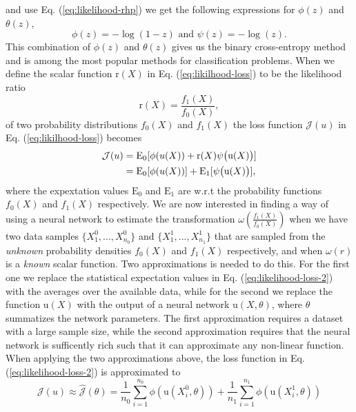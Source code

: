 \documentclass[../../main/main.tex]{subfiles}
\begin{document}
and use Eq. (\ref{eq:likelihood-rhp}) we get the following expressions for \(\phi(z)\) and \(\theta(z)\),
\begin{equation}
  \label{eq:1}
  \phi(z) = - \log{(1 - z)} \text{ and } \psi(z) = - \log{(z)}.
\end{equation}
This combination of \(\phi(z)\) and \(\theta(z)\) gives us the binary cross-entropy method and is among the most popular methods for classification problems.
When we define the scalar function \(\mathrm{r}(X)\) in Eq. (\ref{eq:likilhood-loss}) to be the likelihood ratio
\begin{equation}
  \label{eq:7}
  \mathrm{r}(X) = \frac{f_1(X)}{f_0(X)},
\end{equation}
of two probability distributions \(f_0(X)\) and \(f_1(X)\) the loss function \(\mathcal{J}(u)\) in Eq. (\ref{eq:likilhood-loss}) becomes
\begin{align}
  \label{eq:likelihood-loss-2}
  \mathcal{J}(u) &= \mathrm{E_0}[\phi(u(X)) + \mathrm{r}(X)\psi\big(\mathrm{u}(X)\big)] \notag \\
       &= \mathrm{E_0}[\phi(u(X))] + \mathrm{E_1}[\psi\big(\mathrm{u}(X)\big)],
\end{align}
where the expextation values \(\mathrm{E_0}\) and \(\mathrm{E_1}\) are w.r.t the probability functions \(f_0(X)\) and \(f_1(X)\) respectively. 
We are now interested in finding a way of using  a neural network to estimate the transformation \(\omega(\frac{f_1(X)}{f_0(X)})\) when we have two data samples \(\{X_1^0,...,X^0_{n_0}\}\) and \(\{X_1^1,...,X_{n_1}^1\}\) that are sampled from the \emph{unknown} probability densities \(f_0(X)\) and \(f_1(X)\) respectively, and when \(\omega(r)\) is a \emph{known} scalar function. Two approximations is needed to do this. For the first one we replace the statistical expectation values in Eq. (\ref{eq:likelihood-loss-2}) with the averages over the available data, while for the second we replace the function \(\mathrm{u}(X)\) with the output of a neural network \(\mathrm{u}(X,\theta)\), where \(\theta\) summatizes the network parameters. The first approximation requires a dataset with a large sample size, while the second approximation requires that the neural network is sufficently rich such that it can approximate any non-linear function. 
When applying the two approximations above, the loss function in Eq. (\ref{eq:likelihood-loss-2}) is approximated to
\begin{equation}
  \label{eq:1}
  \mathcal{J}(u) \approx \hat{\mathcal{J}}(\theta) = \frac{1}{n_0}\sum_{i=1}^{n_0} \phi(\mathrm{u}(X_i^0,\theta)) + \frac{1}{n_1}\sum_{i=1}^{n_1} \phi(\mathrm{u}(X_i^1,\theta))
\end{equation}
\end{document}
